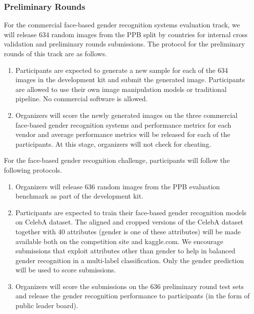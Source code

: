 \documentclass[11pt, oneside]{article}
\begin{document}
\subsubsection{Preliminary Rounds}

For the commercial face-based gender recognition systems evaluation track, we 
will release 634 random images from the PPB split by countries for internal 
cross validation and preliminary rounds submissions. The protocol for the 
preliminary rounds of this track are as follows.

\begin{enumerate}
    \item Participants are expected to generate a new sample for each of the 
    634 images in the development kit and submit the generated image. 
    Participants are allowed to use their own image manipulation models or 
    traditional pipeline. No commercial software is allowed.
    \item Organizers will score the newly generated images on the three 
    commercial face-based gender recognition systems and performance metrics 
    for each vendor and average performance metrics will be released for each 
    of the participants. At this stage, organizers will not check for cheating.
\end{enumerate}

For the face-based gender recognition challenge, participants will follow the 
following protocols.

\begin{enumerate}
    \item Organizers will release 636 random images from the PPB evaluation 
    benchmark as part of the development kit.
    \item Participants are expected to train their face-based gender 
    recognition models on CelebA dataset. The aligned and cropped versions of 
    the CelebA dataset together with 40 attributes (gender is one of these 
    attributes) will be made available both on the competition site and 
    kaggle.com. We encourage submissions that exploit attributes other than 
    gender to help in balanced gender recognition in a multi-label 
    classification. Only the gender prediction will be used to score 
    submissions.
    \item Organizers will score the submissions on the 636 preliminary round 
    test sets and release the gender recognition performance to participants 
    (in the form of public leader board).
\end{enumerate}
\end{document}

